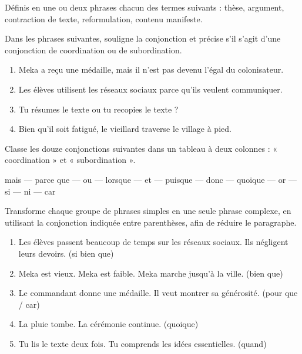 \documentclass[11pt]{article}
\newcommand{\cle}[1]{{\popxbold\color{popdark}#1}}
\newcounter{popsec}
\newcounter{popsub}
\newcommand{\courssub}[1]{%
  \stepcounter{popsub}%
  \par\vspace{9pt}\noindent{\popxbold\fontsize{11.5}{13}\selectfont\color{popink}{\color{poporange}\thepopsec.\thepopsub}\hspace{6pt}#1}\par\nopagebreak\vspace{4pt}
}
\begin{document}
\begin{exercice}[Définitions]
Définis en une ou deux phrases chacun des termes suivants : \cle{thèse}, \cle{argument}, \cle{contraction de texte}, \cle{reformulation}, \cle{contenu manifeste}.
\end{exercice}

\begin{exercice}
Dans les phrases suivantes, souligne la conjonction et précise s'il s'agit d'une conjonction de coordination ou de subordination.
\begin{enumerate}
\item Meka a reçu une médaille, mais il n'est pas devenu l'égal du colonisateur.
\item Les élèves utilisent les réseaux sociaux parce qu'ils veulent communiquer.
\item Tu résumes le texte ou tu recopies le texte ?
\item Bien qu'il soit fatigué, le vieillard traverse le village à pied.
\end{enumerate}
\end{exercice}

\courssub{Je m'entraîne}

\begin{exercice}
Classe les douze conjonctions suivantes dans un tableau à deux colonnes : « coordination » et « subordination ».
\begin{center}
mais — parce que — ou — lorsque — et — puisque — donc — quoique — or — si — ni — car
\end{center}
\end{exercice}

\begin{exercice}
Transforme chaque groupe de phrases simples en une seule phrase complexe, en utilisant la conjonction indiquée entre parenthèses, afin de réduire le paragraphe.
\begin{enumerate}
\item Les élèves passent beaucoup de temps sur les réseaux sociaux. Ils négligent leurs devoirs. (si bien que)
\item Meka est vieux. Meka est faible. Meka marche jusqu'à la ville. (bien que)
\item Le commandant donne une médaille. Il veut montrer sa générosité. (pour que / car)
\item La pluie tombe. La cérémonie continue. (quoique)
\item Tu lis le texte deux fois. Tu comprends les idées essentielles. (quand)
\end{enumerate}
\end{exercice}
\end{document}
